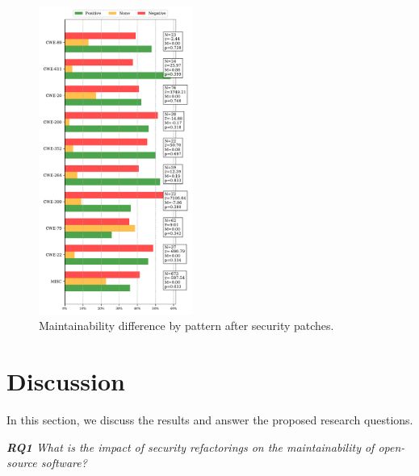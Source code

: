 \documentclass[sigconf,review]{acmart}
\begin{document}
\begin{figure}[h]
 	\centering
 	\includegraphics[width=0.45\textwidth]{figures/maintainability_cwe.pdf}
 	\caption{Maintainability difference by pattern after security patches.}
	\label{fig:pat}	
\end{figure}



\section{Discussion}\label{sec:discussion}

In this section, we discuss the results and answer the proposed research questions.

\begin{framed}
\textit{\textbf{RQ1} What is the impact of security refactorings on the maintainability
of open-source software?}
\vspace{-0.1cm}
\end{framed}
\vspace{-0.1cm}
\end{document}
